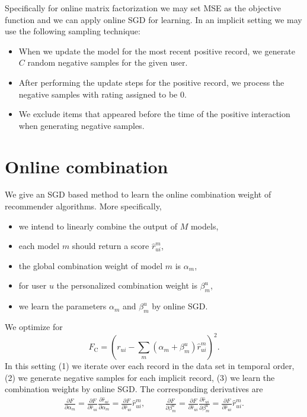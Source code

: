 \documentclass[10pt]{article}
\newenvironment{myitemize}{\begin{itemize} \setlength{\topsep}{0pt} \setlength{\itemsep}{0pt} \setlength{\parskip}{0pt} \setlength{\parsep}{0pt}}{  \end{itemize} }
\begin{document}
Specifically for online matrix factorization we may set MSE as the objective function and we can apply online SGD for learning.
In an implicit setting we may use the following sampling technique:
\begin{myitemize}
\item When we update the model for the most recent positive record, we generate $C$ random negative samples for the given user.
\item After performing the update steps for the positive record, we process the negative samples with rating assigned to be 0.
\item We exclude items that appeared before the time of the positive interaction when generating negative samples.
\end{myitemize}

\section{Online combination}
\label{sec:online-combination}

We give an SGD based method to learn the online combination weight of recommender algorithms.
More specifically,
\begin{myitemize}
	\item we intend to linearly combine the output of $M$ models,
	\item each model $m$ should return a score $\hat{r}_{ui}^m$,
	\item the global combination weight of model $m$ is $\alpha_m$,
	\item for user $u$ the personalized combination weight is $\beta_m^u$,
	\item we learn the parameters $\alpha_m$ and $\beta_m^u$ by online SGD.
\end{myitemize}
We optimize for
\begin{equation}
F_{\text{C}}= \left ( r_{ui} - \displaystyle\sum_m (\alpha_m + \beta_m^u) \hat{r}^m_{ui}\right )^2.
\end{equation}
In this setting (1) we iterate over each record in the data set in temporal order, (2) we generate negative samples for each implicit record, (3) we learn the combination weights by online SGD. The corresponding derivatives are
\begin{gather}
\frac{\partial F}{\partial \alpha_m} = \frac{\partial F}{\partial \hat{r}_{ui}} \frac{\partial \hat{r}_{ui}}{\partial \alpha_m} = \frac{\partial F}{\partial \hat{r}_{ui}} \hat{r}_{ui}^m, \hspace{1cm}
  \frac{\partial F}{\partial \beta_m^u} = \frac{\partial F}{\partial \hat{r}_{ui}} \frac{\partial \hat{r}_{ui}}{\partial \beta_m^u} = \frac{\partial F}{\partial \hat{r}_{ui}} \hat{r}_{ui}^m.
\end{gather}
\end{document}
